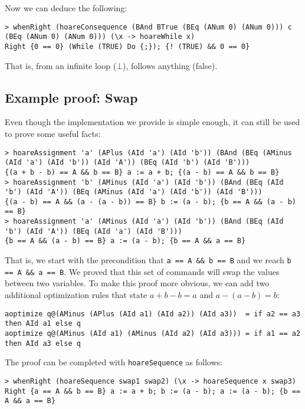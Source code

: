 \documentclass{article}
\begin{document}
Now we can deduce the following:

\begin{lstlisting}
> whenRight (hoareConsequence (BAnd BTrue (BEq (ANum 0) (ANum 0))) c (BEq (ANum 0) (ANum 0))) (\x -> hoareWhile x)
Right {0 == 0} (While (TRUE) Do {;}); {! (TRUE) && 0 == 0}
\end{lstlisting}

That is, from an infinite loop ($\bot$), follows anything (false).

\subsection{Example proof: Swap}

Even though the implementation we provide is simple enough, it can still be used to prove some useful facts:

\begin{lstlisting}
> hoareAssignment 'a' (APlus (AId 'a') (AId 'b')) (BAnd (BEq (AMinus (AId 'a') (AId 'b')) (AId 'A')) (BEq (AId 'b') (AId 'B')))
{(a + b - b) == A && b == B} a := a + b; {(a - b) == A && b == B}
> hoareAssignment 'b' (AMinus (AId 'a') (AId 'b')) (BAnd (BEq (AId 'b') (AId 'A')) (BEq (AMinus (AId 'a') (AId 'b')) (AId 'B')))
{(a - b) == A && (a - (a - b)) == B} b := (a - b); {b == A && (a - b) == B}
> hoareAssignment 'a' (AMinus (AId 'a') (AId 'b')) (BAnd (BEq (AId 'b') (AId 'A')) (BEq (AId 'a') (AId 'B')))
{b == A && (a - b) == B} a := (a - b); {b == A && a == B}
\end{lstlisting}

That is, we start with the precondition that \texttt{a == A \&\& b == B} and we reach \texttt{b == A \&\& a == B}. We proved that this set of commands will swap the values between two variables. To make this proof more obvious, we can add two additional optimization rules that state $a + b - b = a$ and $a - (a - b) = b$:

\begin{lstlisting}
aoptimize q@(AMinus (APlus (AId a1) (AId a2)) (AId a3))  = if a2 == a3 then AId a1 else q
aoptimize q@(AMinus (AId a1) (AMinus (AId a2) (AId a3))) = if a1 == a2 then AId a3 else q
\end{lstlisting}

The proof can be completed with \texttt{hoareSequence} as follows:

\begin{lstlisting}
> whenRight (hoareSequence swap1 swap2) (\x -> hoareSequence x swap3)
Right {a == A && b == B} a := a + b; b := (a - b); a := (a - b); {b == A && a == B}
\end{lstlisting}
\end{document}
